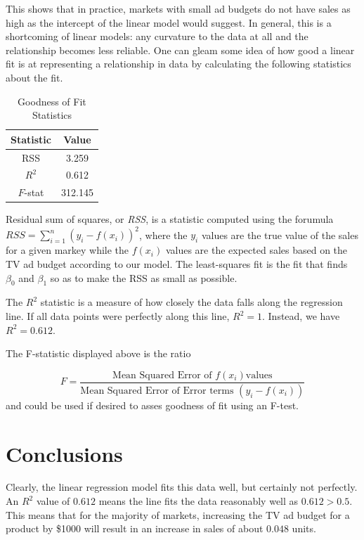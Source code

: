 \documentclass{article}
\begin{document}
This shows that in practice, markets with small ad budgets do not have sales as high as the intercept of the linear model would suggest.  In general, this is a shortcoming of linear models:  any curvature to the data at all and the relationship becomes less reliable.  One can gleam some idea of how good a linear fit is at representing a relationship in data by calculating the following statistics about the fit.

\begin{table}[ht]
\centering
\begin{tabular}{|c|c|}
Statistic & Value \\ \hline
RSS & 3.259 \\
$R^2$ & 0.612 \\
$F$-stat & 312.145 \\
\end{tabular}
\caption{Goodness of Fit Statistics}
\end{table}

Residual sum of squares, or \emph{RSS}, is a statistic computed using the forumula $RSS = \sum_{i=1}^n (y_i - f(x_i))^2$, where the $y_i$ values are the true value of the sales for a given markey while the $f(x_i)$ values are the expected sales based on the TV ad budget according to our model.  The least-squares fit is the fit that finds $\beta_0$ and $\beta_1$ so as to make the RSS as small as possible. 

The $R^2$ statistic is a measure of how closely the data falls along the regression line.  If all data points were perfectly along this line, $R^2 = 1$.  Instead, we have $R^2 = 0.612$.

The F-statistic displayed above is the ratio 

\begin{equation}
F = \frac{\mbox{Mean Squared Error of }f(x_i) \mbox{values}}
               {\mbox{Mean Squared Error of Error terms }{(y_i - f(x_i))}}
\end{equation}
and could be used if desired to asses goodness of fit using an F-test.

\section{Conclusions}

Clearly, the linear regression model fits this data well, but certainly not perfectly. An $R^2$ value of $0.612$ means the line fits the data reasonably well as $0.612 > 0.5$.  This means that for the majority of markets, increasing the TV ad budget for a product by \$1000 will result in an increase in sales of about $0.048$ units. 
\end{document}
